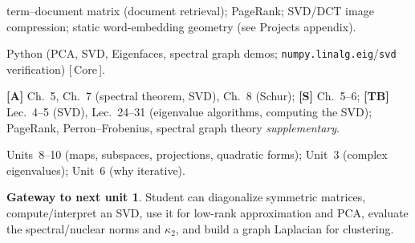 \documentclass[11pt]{article}
\newcommand{\pri}[1]{{\footnotesize\sffamily\color{BrickRed}[\,#1\,]}}
\newenvironment{unitfields}
  {\begin{description}[leftmargin=0pt,labelindent=0pt,style=nextline,
      font=\normalfont\sffamily\bfseries\color{RoyalBlue},itemsep=3pt,topsep=4pt]}
  {\end{description}}
\newcommand{\ff}[1]{\item[#1]}
\theoremstyle{definition}
\newtheorem*{gateway}{Gateway to next unit}
\begin{document}
\begin{unitfields}
  term--document matrix (document retrieval); PageRank; SVD/DCT image
  compression; static word-embedding geometry (see Projects appendix).
\ff{Languages}
  Python (PCA, SVD, Eigenfaces, spectral graph demos;
  \texttt{numpy.linalg.eig}/\texttt{svd} verification) \pri{Core}.
\ff{Textbook refs}
  \textbf{[A]} Ch.~5, Ch.~7 (spectral theorem, SVD), Ch.~8 (Schur);
  \textbf{[S]} Ch.~5--6; \textbf{[TB]} Lec.~4--5 (SVD),
  Lec.~24--31 (eigenvalue algorithms, computing the SVD);
  PageRank, Perron--Frobenius, spectral graph theory \emph{supplementary}.
\ff{ENTER} Units~8--10 (maps, subspaces, projections, quadratic forms); Unit~3 (complex eigenvalues); Unit~6 (why iterative).
\end{unitfields}
\begin{gateway}
Student can diagonalize symmetric matrices, compute/interpret an SVD, use it
for low-rank approximation and PCA, evaluate the spectral/nuclear norms and
$\kappa_2$, and build a graph Laplacian for clustering.
\end{gateway}

\end{document}
